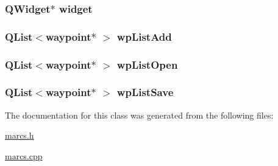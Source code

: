 \hypertarget{a00008_a549c5bee62879e34e9d21701730a2907}{
\subsubsection[{widget}]{\setlength{\rightskip}{0pt plus 5cm}Q\-Widget$\ast$ widget\hspace{0.3cm}{\ttfamily [private]}}}\label{a00008_a549c5bee62879e34e9d21701730a2907}
\hypertarget{a00008_a98ca93f10581619f71df8f495b465cde}{
\subsubsection[{wp\-List\-Add}]{\setlength{\rightskip}{0pt plus 5cm}Q\-List$<${\bf waypoint}$\ast$ $>$ wp\-List\-Add\hspace{0.3cm}{\ttfamily [private]}}}\label{a00008_a98ca93f10581619f71df8f495b465cde}
\hypertarget{a00008_a5d3a9439b166172c9c871c9a723eac19}{
\subsubsection[{wp\-List\-Open}]{\setlength{\rightskip}{0pt plus 5cm}Q\-List$<${\bf waypoint}$\ast$ $>$ wp\-List\-Open\hspace{0.3cm}{\ttfamily [private]}}}\label{a00008_a5d3a9439b166172c9c871c9a723eac19}
\hypertarget{a00008_ad11e2550a13b49086c06cf1c1dbf0a45}{
\subsubsection[{wp\-List\-Save}]{\setlength{\rightskip}{0pt plus 5cm}Q\-List$<${\bf waypoint}$\ast$ $>$ wp\-List\-Save\hspace{0.3cm}{\ttfamily [private]}}}\label{a00008_ad11e2550a13b49086c06cf1c1dbf0a45}


The documentation for this class was generated from the following files\-:\begin{DoxyCompactItemize}
\item 
\hyperlink{a00029}{marcs.\-h}\item 
\hyperlink{a00028}{marcs.\-cpp}\end{DoxyCompactItemize}
